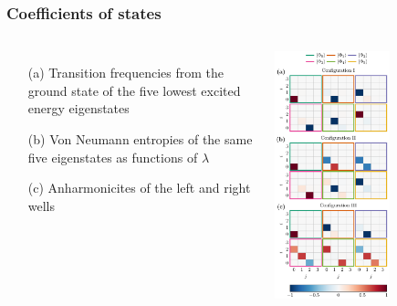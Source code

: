 \documentclass{beamer}
\begin{document}
\frame
    {
      \frametitle{Coefficients of states}
	
      \begin{footnotesize}
     \begin{columns}
       \column{5.0cm}
\begin{itemize}
\item[(a)] Transition frequencies from the ground state of the five lowest excited energy eigenstates

\item[(b)] Von Neumann entropies of the same five eigenstates as functions of $\lambda$

\item[(c)] Anharmonicites of the left and right wells 
\end{itemize}

\column{6cm}
      \begin{center}
	\includegraphics[width=0.6\textwidth]{qcfigures/coeffs.pdf}
      \end{center}
\end{columns}
      \end{footnotesize}
    }
\end{document}
